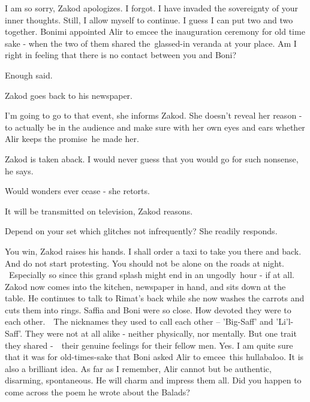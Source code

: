 \documentclass[twoside,11pt]{book}
\begin{document}
{\textquotedbl}I am so sorry,{\textquotedbl} Zakod apologizes. {\textquotedbl}I forgot. I have invaded the sovereignty
of your inner thoughts. Still, I allow myself to continue. I guess I can put two and two together. Bonimi appointed
Alir to emcee the inauguration ceremony for old time sake - when the two of them shared the\ glassed-in veranda at your
place. Am I right in feeling that there is no contact between you and Boni?{\textquotedbl}

{\textquotedbl}Enough said.{\textquotedbl} 

Zakod goes back to his newspaper. 

{\textquotedbl}I'm going to go to that event,{\textquotedbl} she informs Zakod. She doesn't reveal her reason - to
actually be in the audience and make sure with her own eyes and ears whether Alir keeps  the promise\ he made 
her.{\ }

Zakod is taken aback. {\textquotedbl}I would never guess that you would go for such nonsense,{\textquotedbl} he says.

{\textquotedbl}Would wonders ever cease -{\textquotedbl} she retorts.

{\textquotedbl}It will be transmitted on television,{\textquotedbl} Zakod reasons.

{\textquotedbl}Depend on your set which glitches not infrequently?{\textquotedbl} She readily responds.\ 

{\textquotedbl}You win,{\textquotedbl} Zakod raises his hands. {\textquotedbl}I shall order a taxi to take you there and
back. And do not start protesting. You should not be alone on the roads at night. ~Especially so since this grand
splash might end in an ungodly\ hour - if at all.{\textquotedbl}~ Zakod now comes into the kitchen, newspaper in hand,
and sits down at the table. He continues to talk to Rimat's back while she now washes the carrots and cuts them into
rings. {\textquotedbl}Saffia and Boni were so close.  How devoted they were to each other{.}\ \ The
nicknames they used to call each other -- 'Big-Saff' and 'Li'l-Saff'. They were not at all alike - neither physically,
nor mentally. But one trait they shared -~{\ }their genuine feelings for their
fellow men. Yes. I am quite sure that it was for old-times-sake that Boni asked Alir to emcee~this hullabaloo. It is
also a brilliant idea. As far as I remember, Alir cannot but be authentic, disarming, spontaneous. He will charm and
impress them all. Did you happen to come across the poem he wrote about the Balads?{\textquotedbl}
\end{document}
